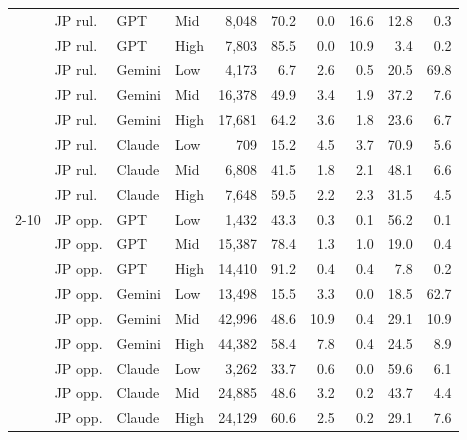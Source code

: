 \begin{table}[t]
\begin{tabular}{llllrrrrrr}
 & JP rul. & GPT & Mid & 8{,}048 & 70.2 & 0.0 & 16.6 & 12.8 & 0.3 \\
 & JP rul. & GPT & High & 7{,}803 & 85.5 & 0.0 & 10.9 & 3.4 & 0.2 \\
 & JP rul. & Gemini & Low & 4{,}173 & 6.7 & 2.6 & 0.5 & 20.5 & 69.8 \\
 & JP rul. & Gemini & Mid & 16{,}378 & 49.9 & 3.4 & 1.9 & 37.2 & 7.6 \\
 & JP rul. & Gemini & High & 17{,}681 & 64.2 & 3.6 & 1.8 & 23.6 & 6.7 \\
 & JP rul. & Claude & Low & 709 & 15.2 & 4.5 & 3.7 & 70.9 & 5.6 \\
 & JP rul. & Claude & Mid & 6{,}808 & 41.5 & 1.8 & 2.1 & 48.1 & 6.6 \\
 & JP rul. & Claude & High & 7{,}648 & 59.5 & 2.2 & 2.3 & 31.5 & 4.5 \\
\cmidrule(lr){2-10}
 & JP opp. & GPT & Low & 1{,}432 & 43.3 & 0.3 & 0.1 & 56.2 & 0.1 \\
 & JP opp. & GPT & Mid & 15{,}387 & 78.4 & 1.3 & 1.0 & 19.0 & 0.4 \\
 & JP opp. & GPT & High & 14{,}410 & 91.2 & 0.4 & 0.4 & 7.8 & 0.2 \\
 & JP opp. & Gemini & Low & 13{,}498 & 15.5 & 3.3 & 0.0 & 18.5 & 62.7 \\
 & JP opp. & Gemini & Mid & 42{,}996 & 48.6 & 10.9 & 0.4 & 29.1 & 10.9 \\
 & JP opp. & Gemini & High & 44{,}382 & 58.4 & 7.8 & 0.4 & 24.5 & 8.9 \\
 & JP opp. & Claude & Low & 3{,}262 & 33.7 & 0.6 & 0.0 & 59.6 & 6.1 \\
 & JP opp. & Claude & Mid & 24{,}885 & 48.6 & 3.2 & 0.2 & 43.7 & 4.4 \\
 & JP opp. & Claude & High & 24{,}129 & 60.6 & 2.5 & 0.2 & 29.1 & 7.6 \\
\bottomrule
\end{tabular}
\end{table}
